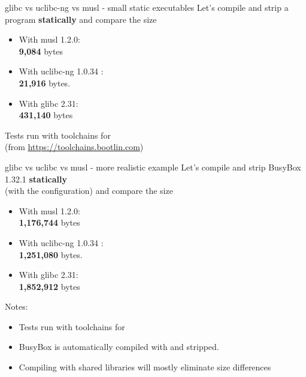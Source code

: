 \begin{frame}{glibc vs uclibc-ng vs musl - small static executables}
  Let's compile and strip a  program {\bf statically} and
compare the size
  \begin{itemize}
    \item With musl 1.2.0:\\
          {\bf 9,084} bytes
    \item With uclibc-ng 1.0.34 :\\
          {\bf 21,916} bytes.
    \item With glibc 2.31:\\
          {\bf 431,140} bytes
  \end{itemize}
  Tests run with  toolchains for \\
  (from \url{https://toolchains.bootlin.com})
\end{frame}

\begin{frame}{glibc vs uclibc vs musl - more realistic example}
  Let's compile and strip BusyBox 1.32.1 {\bf statically}\\
  (with the  configuration) and compare the size
  \begin{itemize}
    \item With musl 1.2.0:\\
          {\bf 1,176,744} bytes
    \item With uclibc-ng 1.0.34 :\\
          {\bf 1,251,080} bytes.\\
    \item With glibc 2.31:\\
          {\bf 1,852,912} bytes
  \end{itemize}
  Notes:
  \begin{itemize}
    \item Tests run with  toolchains for 
    \item BusyBox is automatically compiled with  and stripped.
    \item Compiling with shared libraries will mostly eliminate size differences
  \end{itemize}
\end{frame}


